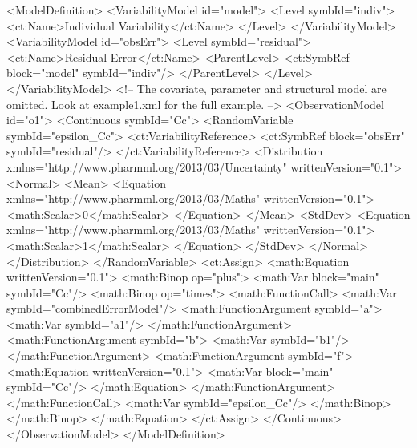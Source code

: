 \documentclass[a4paper,10pt]{article}
\begin{document}
\begin{xmlcode}
<ModelDefinition>
    <VariabilityModel id="model">
        <Level symbId="indiv">
            <ct:Name>Individual Variability</ct:Name>
        </Level>
    </VariabilityModel>
    <VariabilityModel id="obsErr">
        <Level symbId="residual">
            <ct:Name>Residual Error</ct:Name>
            <ParentLevel>
                <ct:SymbRef block="model" symbId="indiv"/>
            </ParentLevel>
        </Level>
    </VariabilityModel>
    <!-- 
       The covariate, parameter and structural model are omitted. Look at
       example1.xml for the full example.
       -->
    <ObservationModel id="o1">
        <Continuous symbId="Cc">
            <RandomVariable symbId="epsilon_Cc">
                <ct:VariabilityReference>
                    <ct:SymbRef block="obsErr" symbId="residual"/>
                </ct:VariabilityReference>
                <Distribution xmlns="http://www.pharmml.org/2013/03/Uncertainty"
                    writtenVersion="0.1">
                    <Normal>
                        <Mean>
                            <Equation xmlns="http://www.pharmml.org/2013/03/Maths"
                                writtenVersion="0.1">
                                <math:Scalar>0</math:Scalar>
                            </Equation>
                        </Mean>
                        <StdDev>
                            <Equation xmlns="http://www.pharmml.org/2013/03/Maths"
                                writtenVersion="0.1">
                                <math:Scalar>1</math:Scalar>
                            </Equation>
                        </StdDev>
                    </Normal>
                </Distribution>
            </RandomVariable>
            <ct:Assign>
                <math:Equation writtenVersion="0.1">
                    <math:Binop op="plus">
                        <math:Var block="main" symbId="Cc"/>
                        <math:Binop op="times">
                            <math:FunctionCall>
                                <math:Var symbId="combinedErrorModel"/>
                                <math:FunctionArgument symbId="a">
                                    <math:Var symbId="a1"/>
                                </math:FunctionArgument>
                                <math:FunctionArgument symbId="b">
                                    <math:Var symbId="b1"/>
                                </math:FunctionArgument>
                                <math:FunctionArgument symbId="f">
                                    <math:Equation writtenVersion="0.1">
                                        <math:Var block="main" symbId="Cc"/>
                                    </math:Equation>
                                </math:FunctionArgument>
                            </math:FunctionCall>
                            <math:Var symbId="epsilon_Cc"/>
                        </math:Binop>
                    </math:Binop>
                </math:Equation>
            </ct:Assign>
        </Continuous>
    </ObservationModel>
</ModelDefinition>
\end{xmlcode}
\end{document}

